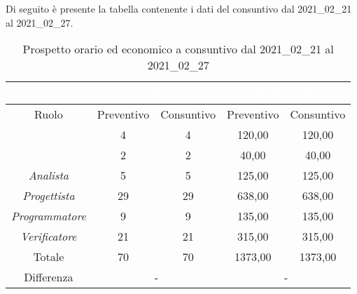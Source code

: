 Di seguito è presente la tabella contenente i dati del consuntivo dal 2021\_02\_21 al 2021\_02\_27.
\begin{table}[H]
	\centering
	\begin{tabular}{|c|c|c|c|c|}
		\rowcolor{darkblue} 
		&\multicolumn{2}{c|}{\textcolor{white}{Ore}}&\multicolumn{2}{c|}{\textcolor{white}{Costo in €}}\\ \hline
		Ruolo			&	Preventivo				&	Consuntivo		&	Preventivo	&	Consuntivo\\ \hline
		{\Responsabile}		&	4					&	4				&	120,00		&	120,00 \\ \hline
		{\Amministratore}	&	2					&	2				&	40,00		&	40,00 \\ \hline
		\textit{Analista}	&	5					&	5				&	125,00		&	125,00 \\ \hline
		\textit{Progettista}& 	29					&   29 				& 	638,00		&  	638,00 \\ \hline
		\textit{Programmatore}& 9					& 	9				& 	135,00		&  	135,00 \\ \hline
		\textit{Verificatore}&	21					&	21				&	315,00		&	315,00 \\ \hline
		Totale				&	70					&	70				&	1373,00		&	1373,00 \\ \hline
		Differenza			& 	\multicolumn{2}{c|}{-} 			&\multicolumn{2}{c|}{-}\\ \hline
	\end{tabular}
	\caption{Prospetto orario ed economico a consuntivo dal 2021\_02\_21 al 2021\_02\_27}
\end{table}
